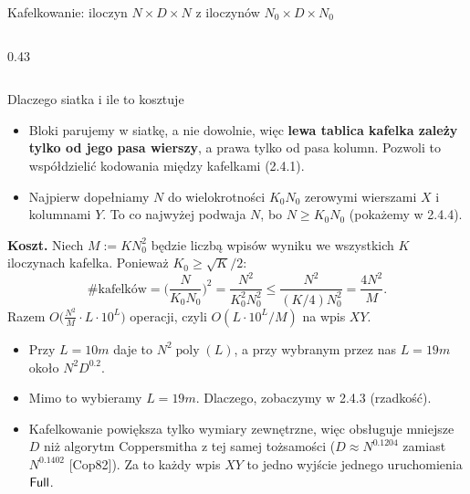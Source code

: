 \begin{frame}{Kafelkowanie: iloczyn $N\times D\times N$ z iloczynów $N_0\times D\times N_0$}
\begin{columns}[T]
\begin{column}{0.43\textwidth}
    \end{column}
  \end{columns}
\end{frame}

\begin{frame}{Dlaczego siatka i ile to kosztuje}
  \begin{itemize}
    \item Bloki parujemy w siatkę, a nie dowolnie, więc \textbf{lewa tablica kafelka zależy tylko od jego pasa wierszy},
      a prawa tylko od pasa kolumn. Pozwoli to \alert{współdzielić kodowania} między kafelkami (2.4.1).
    \item Najpierw dopełniamy $N$ do wielokrotności $K_0N_0$ zerowymi wierszami $X$ i kolumnami $Y$.
      To co najwyżej podwaja $N$, bo $N\ge K_0N_0$ (pokażemy w 2.4.4).
  \end{itemize}
  \pause
  \textbf{Koszt.} Niech $M:=KN_0^2$ będzie liczbą wpisów wyniku we wszystkich $K$ iloczynach kafelka.
  Ponieważ $K_0\ge\sqrt K/2$:
  \[
    \#\text{kafelków}=\Big(\frac{N}{K_0N_0}\Big)^2=\frac{N^2}{K_0^2N_0^2}\le\frac{N^2}{(K/4)N_0^2}=\frac{4N^2}{M}.
  \]
  \pause
  Razem $O\big(\frac{N^2}{M}\cdot L\cdot10^L\big)$ operacji, czyli $O(L\cdot10^L/M)$ na wpis $XY$.
  \begin{itemize}
    \item Przy $L=10m$ daje to $N^2\operatorname{poly}(L)$, a przy wybranym przez nas $L=19m$ około $N^2D^{0.2}$.
    \item<4-> Mimo to wybieramy $L=19m$. Dlaczego, zobaczymy w 2.4.3 (rzadkość).
    \item<4-> Kafelkowanie powiększa tylko wymiary zewnętrzne, więc obsługuje mniejsze $D$ niż algorytm Coppersmitha z tej samej tożsamości
      ($D\approx N^{0.1204}$ zamiast $N^{0.1402}$ [Cop82]). Za to \alert{każdy wpis $XY$ to jedno wyjście jednego uruchomienia $\mathsf{Full}$}.
  \end{itemize}
\end{frame}
